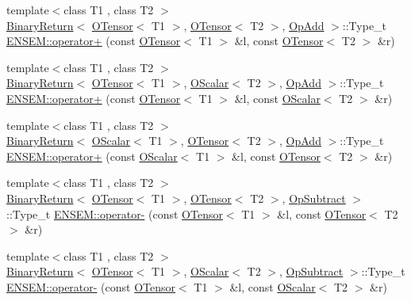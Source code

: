 \begin{DoxyCompactItemize}
{\footnotesize template$<$class T1 , class T2 $>$ }\\\mbox{\hyperlink{structENSEM_1_1BinaryReturn}{Binary\+Return}}$<$ \mbox{\hyperlink{classENSEM_1_1OTensor}{O\+Tensor}}$<$ T1 $>$, \mbox{\hyperlink{classENSEM_1_1OTensor}{O\+Tensor}}$<$ T2 $>$, \mbox{\hyperlink{structENSEM_1_1OpAdd}{Op\+Add}} $>$\+::Type\+\_\+t \mbox{\hyperlink{group__obstensor_gad61499ec3fe572c419aa5143ef37d965}{E\+N\+S\+E\+M\+::operator+}} (const \mbox{\hyperlink{classENSEM_1_1OTensor}{O\+Tensor}}$<$ T1 $>$ \&l, const \mbox{\hyperlink{classENSEM_1_1OTensor}{O\+Tensor}}$<$ T2 $>$ \&r)
\item 
{\footnotesize template$<$class T1 , class T2 $>$ }\\\mbox{\hyperlink{structENSEM_1_1BinaryReturn}{Binary\+Return}}$<$ \mbox{\hyperlink{classENSEM_1_1OTensor}{O\+Tensor}}$<$ T1 $>$, \mbox{\hyperlink{classENSEM_1_1OScalar}{O\+Scalar}}$<$ T2 $>$, \mbox{\hyperlink{structENSEM_1_1OpAdd}{Op\+Add}} $>$\+::Type\+\_\+t \mbox{\hyperlink{group__obstensor_gad2c9b97ae39bad4adefe3d2f480c0eb6}{E\+N\+S\+E\+M\+::operator+}} (const \mbox{\hyperlink{classENSEM_1_1OTensor}{O\+Tensor}}$<$ T1 $>$ \&l, const \mbox{\hyperlink{classENSEM_1_1OScalar}{O\+Scalar}}$<$ T2 $>$ \&r)
\item 
{\footnotesize template$<$class T1 , class T2 $>$ }\\\mbox{\hyperlink{structENSEM_1_1BinaryReturn}{Binary\+Return}}$<$ \mbox{\hyperlink{classENSEM_1_1OScalar}{O\+Scalar}}$<$ T1 $>$, \mbox{\hyperlink{classENSEM_1_1OTensor}{O\+Tensor}}$<$ T2 $>$, \mbox{\hyperlink{structENSEM_1_1OpAdd}{Op\+Add}} $>$\+::Type\+\_\+t \mbox{\hyperlink{group__obstensor_ga182db37f6b2f7005ba76d65458ac5424}{E\+N\+S\+E\+M\+::operator+}} (const \mbox{\hyperlink{classENSEM_1_1OScalar}{O\+Scalar}}$<$ T1 $>$ \&l, const \mbox{\hyperlink{classENSEM_1_1OTensor}{O\+Tensor}}$<$ T2 $>$ \&r)
\item 
{\footnotesize template$<$class T1 , class T2 $>$ }\\\mbox{\hyperlink{structENSEM_1_1BinaryReturn}{Binary\+Return}}$<$ \mbox{\hyperlink{classENSEM_1_1OTensor}{O\+Tensor}}$<$ T1 $>$, \mbox{\hyperlink{classENSEM_1_1OTensor}{O\+Tensor}}$<$ T2 $>$, \mbox{\hyperlink{structENSEM_1_1OpSubtract}{Op\+Subtract}} $>$\+::Type\+\_\+t \mbox{\hyperlink{group__obstensor_gacbd7414e163d7986e5bcfb720e77b733}{E\+N\+S\+E\+M\+::operator-\/}} (const \mbox{\hyperlink{classENSEM_1_1OTensor}{O\+Tensor}}$<$ T1 $>$ \&l, const \mbox{\hyperlink{classENSEM_1_1OTensor}{O\+Tensor}}$<$ T2 $>$ \&r)
\item 
{\footnotesize template$<$class T1 , class T2 $>$ }\\\mbox{\hyperlink{structENSEM_1_1BinaryReturn}{Binary\+Return}}$<$ \mbox{\hyperlink{classENSEM_1_1OTensor}{O\+Tensor}}$<$ T1 $>$, \mbox{\hyperlink{classENSEM_1_1OScalar}{O\+Scalar}}$<$ T2 $>$, \mbox{\hyperlink{structENSEM_1_1OpSubtract}{Op\+Subtract}} $>$\+::Type\+\_\+t \mbox{\hyperlink{group__obstensor_ga795d9d1bc036d1f9ddcab90e55085d67}{E\+N\+S\+E\+M\+::operator-\/}} (const \mbox{\hyperlink{classENSEM_1_1OTensor}{O\+Tensor}}$<$ T1 $>$ \&l, const \mbox{\hyperlink{classENSEM_1_1OScalar}{O\+Scalar}}$<$ T2 $>$ \&r)

\end{DoxyCompactItemize}
